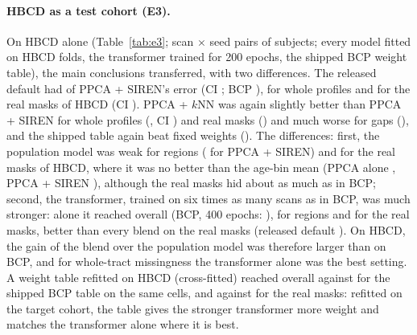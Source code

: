 \documentclass[11pt]{article}
\begin{document}
\paragraph{HBCD as a test cohort (E3).} On HBCD alone (Table~\ref{tab:e3}; \eThreePairs{} scan $\times$ seed pairs of
\eThreeSubjects{} subjects; every model fitted on HBCD folds, the transformer trained for 200 epochs, the shipped BCP weight
table), the main conclusions transferred, with two differences. The released default had \eThreeFinalVsDef{} of PPCA +
SIREN's error (CI \eThreeFinalVsDefCi; BCP \cORatio), \eThreeFinalVsDefWhole{} for whole profiles and
\eThreeFinalVsDefReal{} for the real masks of HBCD (CI \eThreeFinalVsDefRealCi). PPCA + $k$NN was again slightly better than
PPCA + SIREN for whole profiles (\eThreeKnnVsDefWhole, CI \eThreeKnnVsDefWholeCi) and real masks (\eThreeKnnVsDefReal) and
much worse for gaps (\eThreeKnnVsDefGap), and the shipped table again beat fixed weights (\eThreeFinalVsFixed). The
differences: first, the population model was weak for regions (\eThreeDefRegion{} for PPCA + SIREN) and for the real masks of
HBCD, where it was no better than the age-bin mean (PPCA alone \eThreePpcaReal, PPCA + SIREN \eThreeDefReal), although the
real masks hid about as much as in BCP; second, the transformer, trained on six times as many scans as in BCP, was much
stronger: alone it reached \eThreeTf{} overall (BCP, 400 epochs: \rTfFour), \eThreeTfRegion{} for regions and
\eThreeTfReal{} for the real masks, better than every blend on the real masks (released default \eThreeFinalReal). On HBCD,
the gain of the blend over the population model was therefore larger than on BCP, and for whole-tract missingness the
transformer alone was the best setting. A weight table refitted on HBCD (cross-fitted) reached \eThreeRefit{} overall
against \eThreeShippedDump{} for the shipped BCP table on the same cells, and \eThreeRefitReal{} against
\eThreeShippedReal{} for the real masks: refitted on the target cohort, the table gives the stronger transformer more weight
and matches the transformer alone where it is best.

\begin{table}[t]
\centering\footnotesize
\caption{E3: HBCD alone (seeds 0--2, 20 scans per bin; transformer 200 epochs; shipped BCP weight table).}\label{tab:e3}
\resizebox{\textwidth}{!}{}
\end{table}
\end{document}
